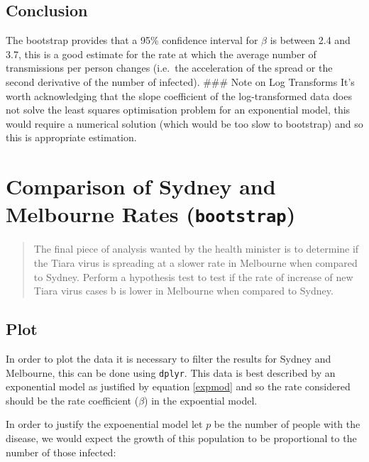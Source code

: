 \documentclass{article}
\newcommand{\passthrough}[1]{#1}
\begin{document}
\subsection{Conclusion}
The bootstrap provides that a 95\% confidence interval for
\(\beta\) is between 2.4 and 3.7, this is a good estimate for the rate at
which the average number of transmissions per person changes (i.e.~the
acceleration of the spread or the second derivative of the number of
infected). \#\#\# Note on Log Transforms It's worth acknowledging that
the slope coefficient of the log-transformed data does not solve the
least squares optimisation problem for an exponential model, this would
require a numerical solution (which would be too slow to bootstrap) and
so this is appropriate estimation.

\hypertarget{question-5}{%
\section{Comparison of Sydney and Melbourne Rates \normalsize \qquad (\texttt{bootstrap})}\label{question-5}}

\begin{quote}
The final piece of analysis wanted by the health minister is to
determine if the Tiara virus is spreading at a slower rate in Melbourne
when compared to Sydney. Perform a hypothesis test to test if the rate
of increase of new Tiara virus cases b is lower in Melbourne when
compared to Sydney.
\end{quote}

\hypertarget{plot-4}{%
\subsection{Plot}\label{plot-4}}

In order to plot the data it is necessary to filter the results for
Sydney and Melbourne, this can be done using
\passthrough{\lstinline!dplyr!}. This data is best described by an
exponential model as justified by equation \eqref{expmod} and so the
rate considered should be the rate coefficient (\(\beta\)) in the
expoential model.

In order to justify the expoenential model let \(p\) be the number of
people with the disease, we would expect the growth of this population
to be proportional to the number of those infected:
\end{document}
